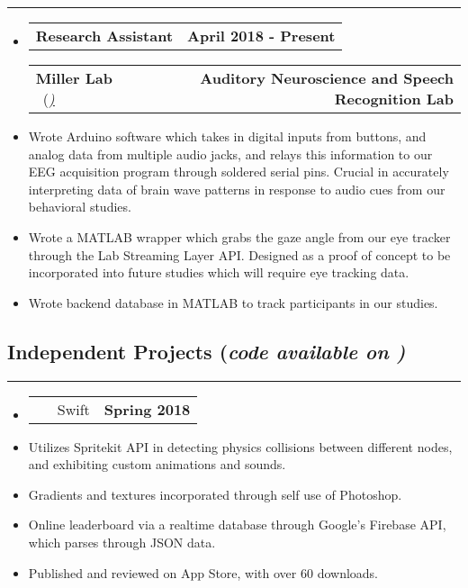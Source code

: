 \documentclass[10pt,letterpaper]{article}
\makeatletter
\newcommand{\items}[2]
{
	\begin{tabular*}{\linewidth}{l @{\extracolsep{\fill}} r}
		#1 & #2 \\
	\end{tabular*}
}
\newcommand{\sectionbreak}
{
	\vspace{-1.2em}
	\rule{\textwidth}{1.7pt}
	\vspace{-1.7em}
}
\makeatother
\begin{document}
\hrule

\begin{itemize}
	\item[]
		\items
			{\textbf{Research Assistant}} 
			{\textbf{April 2018 - Present}}
		\items
		{\textbf{Miller Lab} \ (\href{https://millerlab.faculty.ucdavis.edu}{\small \emph{\underline{\smash{millerlab.faculty.ucdavis.edu})}} } }
			{\textbf{Auditory Neuroscience and Speech Recognition Lab}} 
		\item
			Wrote Arduino software which takes in digital inputs from buttons, and analog data from multiple audio jacks, and relays this information to our EEG acquisition program through soldered serial pins. Crucial in accurately interpreting data of brain wave patterns in response to audio cues from our behavioral studies.
		\item 
			Wrote a MATLAB wrapper which grabs the gaze angle from our eye tracker through the Lab Streaming Layer API. Designed as a proof of concept to be incorporated into future studies which will require eye tracking data.
		\item
			Wrote backend database in MATLAB to track participants in our studies.
\end{itemize}

\vspace{-1.5em}

\subsection*{Independent Projects (\emph{code available on \emph{\href{https://github.com/aashpointo}{\emph{\underline{}}}})}}
\sectionbreak

	

\begin{itemize}
	\item[]
		\items 
		{
			\href{https://itunes.apple.com/us/app/round-bound/id1369632746?mt=8}{\emph{\underline{\smash{\textbf{Round 'a Bound}}}}} \ \ \ \footnotesize Swift
		}
			{\textbf{Spring 2018}}
		\item 
			Utilizes Spritekit API in detecting physics collisions between different nodes, and exhibiting custom animations and sounds.
		\item
			Gradients and textures incorporated through self use of Photoshop.
		\item
			Online leaderboard via a realtime database through Google's Firebase API, which parses through JSON data. 
		\item
			Published and reviewed on App Store, with over 60 downloads. 
\end{itemize}
\end{document}
